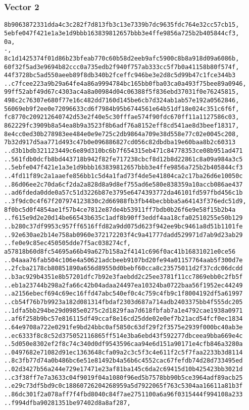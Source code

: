 \documentclass[
]{article}
\begin{document}
\hypertarget{vector-2-2}{%
\subsubsection{Vector 2}\label{vector-2-2}}

\begin{verbatim}
8b9063872331dda4c3c282f7d813fb3c13e7339b7dc9635fdc764e32cc57cb15,
5ebfe047f421e1a3e1d9bbb163839812657bbb3e4ffe9856a725b2b405844cf3,
0a,
-,
8c1d1425374f01d86b23bfeab770c60b58d2eeb9afc5900c8b8a918d09a6086b,
60f32f5ad3e9694b82ccc0a735edb2f940f757ab333cc5f7b0a41158b80f574f,
44f3728bc5ad550aeeb89f8db340b2fceffc946be3e2d8c5d99b47c1fce344b3
..c7fcee223a9b29a64fe4a86a9994784bc165bb0fba03ca0a493f75bee89a0946,
99ff52abf49d67c4303ac4a8a00984d04c06388f5f836ebd37031f0e76245815,
498c2c76307e680f77e16c482dd7160d145be6cb7d324ab1ab57e192a0562846,
56069eb9f2ee0e72096633cd6f7984b95b6744561e64b51df18e024c351c6f6f,
fc8770c209212640742d53e2f40e5c30fffae574f90fdc670ff11a1127586c03,
862229fc3909b8a54ea8b9a3523f8b6adf76a8152eff8cd541ae8d3beef18317,
8e4cc0ed30b278983ee484e0e9e725c2db9864a709e38d558e77c02e0045c208,
7b32d917d5aa771d493c47b0e096886827cd056c82dbdba19e60baa8b2c60313
..d3b1bdb321123449c6e89d310bc6b7f654315eb471c84778353ce08b951ad471
..561fdb0dcfb8bd443718b942f82fe717238cbcf8d12b8d22861c8a09a984a3c5
..5ebfe047f421e1a3e1d9bbb163839812657bbb3e4ffe9856a725b2b405844cf3
..4fd11f89c2a1aaefe856bb1c5d4a1fad73f4de5e41804ca2c17ba26d6e10050c
..86d06ee2c70da6cf2da2a828d8a9d8ef755ad6e580e838359a10accb086ae437
..ad6fdeda0dde0a57c51d3226b87e3795e6474393772da46101fd597fbd456c1b
..3f9dc0c4f67f207974123830c2d66988fb3fb44becbbba5a64143f376edc51d9,
8f0bc5d0f4854ae1f57b4ce7812e87de4b53911ff7bdb0b26f6e9e58f15b2b4a
..f615e9d2e20d14be66543b635c1adf8b90ff3eddf4aa18cfa02510255e50b129
..b280c37df9953c957ff6516ffd82a9dd075d623f942ee9bc9461a8d51b1101fe
..92e630ae2b14e758ab0960e372172203f4c9a41777dadd529971d7ab9d23ab29
..fe0e9c85ec450505dde7f5ac038274cf,
a57818b60d8fc54695a66b49a627b158a2f4141c696f0ac41b16831021e0ce56
..04aaa76fab504c106e4a50621adcbeeb9107bd20fe94a01157764aab5f300d7e
..2fcba2178cb80851890a656d89550d0bebf60cca8c23575011d2f37cdc06dcdd
..b3ac929b4351e8b57201dfc7b92e3faebdd2c25ee3781f11cc7869ebb0c2fb5f
..eb1a23744b298a2fa66c42b04adaa24497ea10324ba0722baa56f1952ec44249
..a2156ebecf694c69ec16ffd47abc540ef0c4c759c4fb9c1f8004192df5a61997
..cb54f76b7b9923a182d081314fbdaf2303d687a714adb2403375bb4f555dc205
..1dfa5bb294be29d0985e0275c2d1829faa7d618fbfab7a1e4792cae1938a0971
..af6f258b9bc57e816115df49ccaf8e16cd25dde02e0ef7b21acd54fcf0ec1834
..64e9708a722e0291fe9bd24bbc0af5850c63df29f2f3575e2939f000bc40ab3e
..ec6333f8c8c52d375052116865ff514e3ba6ebd43f592277dbceea9bba669e4c
..5d050e8302ef2f8c74c340d0df9543596caa94e6d151a90171e4cfb846a3280a
..0497682e71082d91ec1363648cfa09a2c3c5f3c4e611f2c5f7faa2233b3d8114
..8c3fb77d74a0b486bc6e51e81492b4a56b6c4552cac67fefdb74d28d733495ed
..02d3427b56a244e729e17471e23af81ba145c6da2c69415d10b425423bb3021d
..c3f38ff7e7a3633c04f9019f04a1080f96ed5b7578bb90b5ce3964adf89acb25
..e29c73df5bd9c0c18860726204268959a5d7922065f763c5304aa16611a81b3f
..86dc301f2a078aff7f4fbd8040c84f7ae2751100a6a96f0315444f994108a233
..f994dfba90281351be97402d8a8af287,
\end{verbatim}
\end{document}
